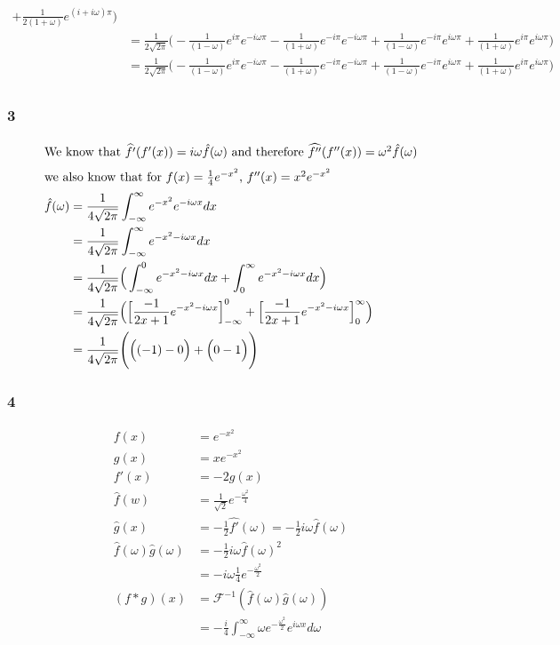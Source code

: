 \documentclass[a4paper]{article}
\newcommand{\ex}[1]{\subsubsection*{#1}}
\begin{document}
\begin{enumerate}[label=\alph*)]
{\begin{align}
                + \frac{1}{2(1+\omega )} e^{(i+i\omega )\pi} \Bigg) \\
            &= \frac{1}{2\sqrt{2\pi}} \Bigg( 
                - \frac{1}{(1-\omega )} e^{i\pi}e^{-i\omega \pi} 
                - \frac{1}{(1+\omega )} e^{-i\pi}e^{-i\omega \pi} 
                + \frac{1}{(1-\omega )} e^{-i\pi}e^{i\omega \pi} 
                + \frac{1}{(1+\omega )} e^{i\pi}e^{i\omega \pi} \Bigg) \\
            &= \frac{1}{2\sqrt{2\pi}} \Bigg( 
                - \frac{1}{(1-\omega )} e^{i\pi}e^{-i\omega \pi} 
                - \frac{1}{(1+\omega )} e^{-i\pi}e^{-i\omega \pi} 
                + \frac{1}{(1-\omega )} e^{-i\pi}e^{i\omega \pi} 
                + \frac{1}{(1+\omega )} e^{i\pi}e^{i\omega \pi} \Bigg) \\
        \end{align}
    }
\end{enumerate}

\ex{3}

\begin{align}
    \intertext{We know  that \( \widehat{f'}(f'(x)) = i\omega \hat f(\omega )\) and therefore 
        \(\widehat{f''}(f''(x)) = \omega ^2 \hat f(\omega )\)}
    \intertext{we also know that for \(f(x) = \frac{1}{4}e^{-x^2}\), \(f''(x) = x^2e^{-x^2}\)}
    \hat f(\omega ) &= \frac{1}{4\sqrt{2\pi}}\int_{-\infty}^{\infty}{e^{-x^2} e^{-i\omega x} dx} \\
    &= \frac{1}{4\sqrt{2\pi}}\int_{-\infty}^{\infty}{e^{-x^2-i\omega x} dx} \\
    &= \frac{1}{4\sqrt{2\pi}}\Big(\int_{-\infty}^{0}{e^{-x^2-i\omega x} dx}
        + \int_{0}^{\infty}{e^{-x^2-i\omega x} dx}\Big) \\
    &= \frac{1}{4\sqrt{2\pi}}\Big(\Big[{\frac{-1}{2x+1}e^{-x^2-i\omega x}\Big]_{-\infty}^{0}} 
        + \Big[{\frac{-1}{2x+1}e^{-x^2-i\omega x}\Big]_{0}^{\infty}}\Big) \\
    &= \frac{1}{4\sqrt{2\pi}}\Bigg(\Big( (-1) - 0\Big) + \Big(0 - 1 \Big)\Bigg) \\
\end{align}


\ex{4}

\begin{align}
    f(x) &= e^{-x^2} \\
    g(x) &= xe^{-x^2} \\
    f'(x) &= -2g(x) \\
    \hat f(w) &= \frac{1}{\sqrt{2}} e^{-\frac{\omega^2}{4}} \\
    \hat g(x) &= -\frac{1}{2} \widehat{f'}(\omega) = -\frac{1}{2}i\omega \hat f(\omega) \\
    \hat f(\omega) \hat g(\omega) &= -\frac{1}{2}i\omega \hat f(\omega)^2 \\
    &= -i\omega\frac{1}{4}e^{-\frac{\omega^2}{2}} \\
    (f*g)(x) &= \mathcal{F}^{-1} ( \hat f(\omega) \hat g(\omega) ) \\
    &= -\frac{i}{4} \int_{-\infty}^{\infty}{\omega e^{-\frac{\omega^2}{2}}
        e^{i\omega x} d\omega}
\end{align}
\end{document}
